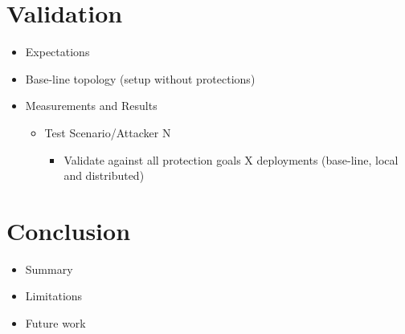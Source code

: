 \documentclass{article}
\begin{document}
\section{Validation} %
\begin{itemize}
    \item Expectations
    \item Base-line topology (setup without protections)
    \item Measurements and Results
    \begin{itemize}
        \item Test Scenario/Attacker N
        \begin{itemize}
            \item Validate against all protection goals X deployments (base-line, local and distributed)
        \end{itemize}
    \end{itemize}
\end{itemize}

\section{Conclusion}
\begin{itemize}
    \item Summary
    \item Limitations
    \item Future work
\end{itemize}

\printbibliography
\end{document}
